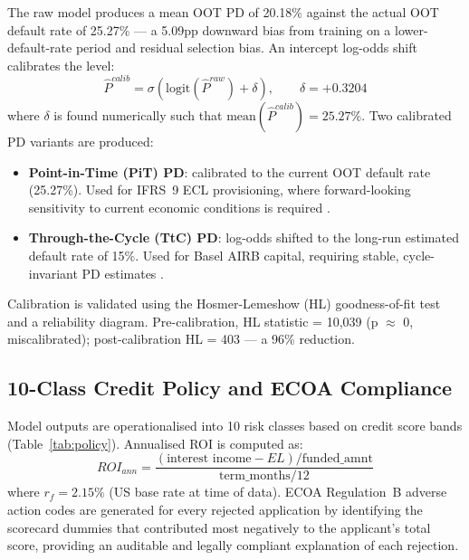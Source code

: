 \documentclass[12pt,a4paper]{report}
\begin{document}
The raw model produces a mean OOT PD of 20.18\% against the actual OOT default rate of 25.27\% --- a 5.09pp downward bias from training on a lower-default-rate period and residual selection bias. An intercept log-odds shift calibrates the level:
\begin{equation}
  \hat{P}^{calib} = \sigma\!\left(\text{logit}(\hat{P}^{raw}) + \delta\right), \qquad \delta = +0.3204
\end{equation}
where $\delta$ is found numerically such that $\text{mean}(\hat{P}^{calib}) = 25.27\%$. Two calibrated PD variants are produced:
\begin{itemize}
  \item \textbf{Point-in-Time (PiT) PD}: calibrated to the current OOT default rate (25.27\%). Used for IFRS~9 ECL provisioning, where forward-looking sensitivity to current economic conditions is required \cite{iasb2014}.
  \item \textbf{Through-the-Cycle (TtC) PD}: log-odds shifted to the long-run estimated default rate of 15\%. Used for Basel AIRB capital, requiring stable, cycle-invariant PD estimates \cite{bcbs2004, repullo2010}.
\end{itemize}

Calibration is validated using the Hosmer-Lemeshow (HL) goodness-of-fit test and a reliability diagram. Pre-calibration, HL statistic = 10,039 (p $\approx$ 0, miscalibrated); post-calibration HL = 403 --- a 96\% reduction.

\subsection{10-Class Credit Policy and ECOA Compliance}

Model outputs are operationalised into 10 risk classes based on credit score bands (Table~\ref{tab:policy}). Annualised ROI is computed as:
\begin{equation}
  ROI_{ann} = \frac{(\text{interest income} - EL) / \text{funded\_amnt}}{\text{term\_months} / 12}
\end{equation}
where $r_f = 2.15\%$ (US base rate at time of data). ECOA Regulation~B adverse action codes are generated for every rejected application by identifying the scorecard dummies that contributed most negatively to the applicant's total score, providing an auditable and legally compliant explanation of each rejection.
\end{document}
